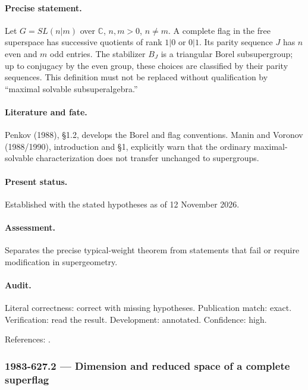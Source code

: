 \paragraph{Precise statement.} Let \(G=SL(n|m)\) over \(\mathbb C\), \(n,m>0\), \(n\ne m\). A complete flag in the free superspace has successive quotients of rank \(1|0\) or \(0|1\). Its parity sequence \(J\) has \(n\) even and \(m\) odd entries. The stabilizer \(B_J\) is a triangular Borel subsupergroup; up to conjugacy by the even group, these choices are classified by their parity sequences. This definition must not be replaced without qualification by “maximal solvable subsuperalgebra.”

\paragraph{Literature and fate.} Penkov (1988), \S1.2, develops the Borel and flag conventions. Manin and Voronov (1988/1990), introduction and \S1, explicitly warn that the ordinary maximal-solvable characterization does not transfer unchanged to supergroups.

\paragraph{Present status.} Established with the stated hypotheses as of 12 November 2026.

\paragraph{Assessment.} Separates the precise typical-weight theorem from statements that fail or require modification in supergeometry.

\paragraph{Audit.} Literal correctness: correct with missing hypotheses. Publication match: exact. Verification: read the result. Development: annotated. Confidence: high.

\noindent References: \citep{penkov1988borel,maninvoronov1988supercell}.\par

\subsubsection{1983-627.2 --- Dimension and reduced space of a complete superflag}

